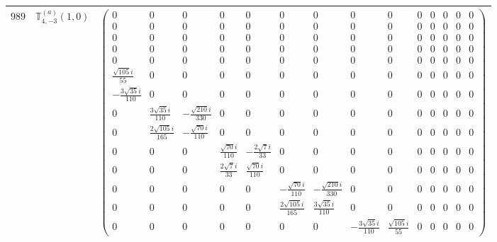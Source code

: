 \documentclass[fleqn,8pt,landscape]{jsarticle}
\begin{document}
\begin{center}
\begin{longtable}{ccc}
$ 989 $ & $ \mathbb{T}_{4,-3}^{(a)}(1,0) $ & $ \begin{pmatrix} 0 & 0 & 0 & 0 & 0 & 0 & 0 & 0 & 0 & 0 & 0 & 0 & 0 & 0 \\ 0 & 0 & 0 & 0 & 0 & 0 & 0 & 0 & 0 & 0 & 0 & 0 & 0 & 0 \\ 0 & 0 & 0 & 0 & 0 & 0 & 0 & 0 & 0 & 0 & 0 & 0 & 0 & 0 \\ 0 & 0 & 0 & 0 & 0 & 0 & 0 & 0 & 0 & 0 & 0 & 0 & 0 & 0 \\ 0 & 0 & 0 & 0 & 0 & 0 & 0 & 0 & 0 & 0 & 0 & 0 & 0 & 0 \\ \frac{\sqrt{105} i}{55} & 0 & 0 & 0 & 0 & 0 & 0 & 0 & 0 & 0 & 0 & 0 & 0 & 0 \\ - \frac{3 \sqrt{35} i}{110} & 0 & 0 & 0 & 0 & 0 & 0 & 0 & 0 & 0 & 0 & 0 & 0 & 0 \\ 0 & \frac{3 \sqrt{35} i}{110} & - \frac{\sqrt{210} i}{330} & 0 & 0 & 0 & 0 & 0 & 0 & 0 & 0 & 0 & 0 & 0 \\ 0 & \frac{2 \sqrt{105} i}{165} & - \frac{\sqrt{70} i}{110} & 0 & 0 & 0 & 0 & 0 & 0 & 0 & 0 & 0 & 0 & 0 \\ 0 & 0 & 0 & \frac{\sqrt{70} i}{110} & - \frac{2 \sqrt{7} i}{33} & 0 & 0 & 0 & 0 & 0 & 0 & 0 & 0 & 0 \\ 0 & 0 & 0 & \frac{2 \sqrt{7} i}{33} & \frac{\sqrt{70} i}{110} & 0 & 0 & 0 & 0 & 0 & 0 & 0 & 0 & 0 \\ 0 & 0 & 0 & 0 & 0 & - \frac{\sqrt{70} i}{110} & - \frac{\sqrt{210} i}{330} & 0 & 0 & 0 & 0 & 0 & 0 & 0 \\ 0 & 0 & 0 & 0 & 0 & \frac{2 \sqrt{105} i}{165} & \frac{3 \sqrt{35} i}{110} & 0 & 0 & 0 & 0 & 0 & 0 & 0 \\ 0 & 0 & 0 & 0 & 0 & 0 & 0 & - \frac{3 \sqrt{35} i}{110} & \frac{\sqrt{105} i}{55} & 0 & 0 & 0 & 0 & 0 \end{pmatrix} $ \\ \hline

\end{longtable}
\end{center}
\end{document}
